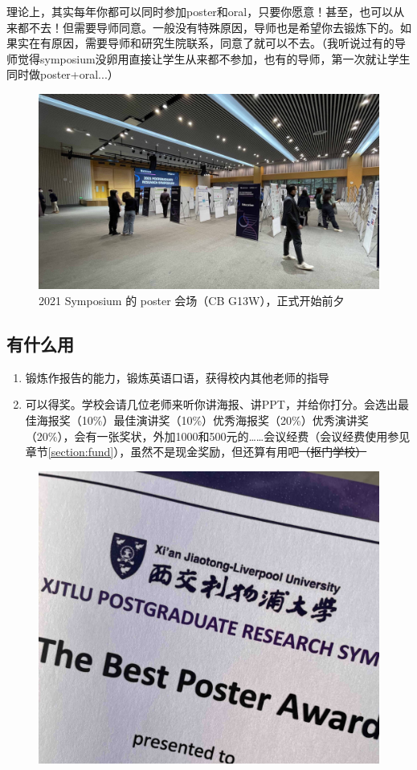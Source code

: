 理论上，其实每年你都可以同时参加poster和oral，只要你愿意！甚至，也可以从来都不去！但需要导师同意。一般没有特殊原因，导师也是希望你去锻炼下的。如果实在有原因，需要导师和研究生院联系，同意了就可以不去。（我听说过有的导师觉得symposium没卵用直接让学生从来都不参加，也有的导师，第一次就让学生同时做poster+oral...）

\begin{figure}[H]
    \caption{2021 Symposium 的 poster 会场（CB G13W），正式开始前夕}
    \centering
    \includegraphics[width=\columnwidth]{author-folder/Kai.Wu/synposium_poster.jpg}
\end{figure}

\subsection{有什么用}

\begin{enumerate}
    \item 锻炼作报告的能力，锻炼英语口语，获得校内其他老师的指导
    \item 可以得奖。学校会请几位老师来听你讲海报、讲PPT，并给你打分。会选出最佳海报奖（10\%）最佳演讲奖（10\%）优秀海报奖（20\%）优秀演讲奖（20\%），会有一张奖状，外加1000和500元的……会议经费（会议经费使用参见章节\ref{section:fund}），虽然不是现金奖励，但还算有用吧\sout{（抠门学校）}
\end{enumerate}

\begin{figure}[H]
    \centering
    \includegraphics[width=0.4\columnwidth]{author-folder/Kai.Wu/poster_award.jpg}
\end{figure}

